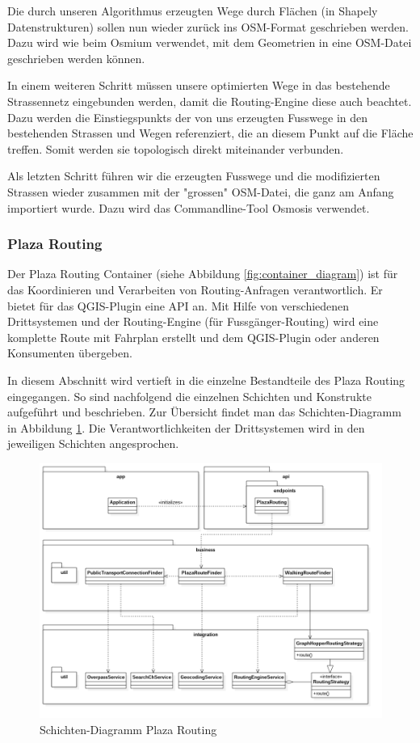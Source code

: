 Die durch unseren Algorithmus erzeugten Wege durch Flächen (in Shapely Datenstrukturen) sollen nun wieder zurück ins \ac{OSM}-Format geschrieben werden. Dazu wird wie beim  Osmium verwendet, mit dem Geometrien in eine OSM-Datei geschrieben werden können.

In einem weiteren Schritt müssen unsere optimierten Wege in das bestehende Strassennetz eingebunden werden, damit die Routing-Engine diese auch beachtet. Dazu werden die \glspl{Einstiegspunkt} der von uns erzeugten Fusswege in den bestehenden Strassen und Wegen referenziert, die an diesem Punkt auf die Fläche treffen. Somit werden sie topologisch direkt miteinander verbunden.

Als letzten Schritt führen wir die erzeugten Fusswege und die modifizierten Strassen wieder zusammen mit der "grossen" \ac{OSM}-Datei, die ganz am Anfang importiert wurde. Dazu wird das Commandline-Tool Osmosis \cite{osmosis} verwendet.

\subsubsection{Plaza Routing}
\label{architektur:Plaza Routing}
Der Plaza Routing Container (siehe Abbildung \ref{fig:container_diagram}) ist für das Koordinieren und Verarbeiten von Routing-Anfragen verantwortlich. Er bietet für das QGIS-Plugin eine API an. Mit Hilfe von verschiedenen Drittsystemen und der Routing-Engine (für Fussgänger-Routing) wird eine komplette Route mit Fahrplan erstellt und dem QGIS-Plugin oder anderen Konsumenten übergeben.

In diesem Abschnitt wird vertieft in die einzelne Bestandteile des Plaza Routing eingegangen. So sind nachfolgend die einzelnen Schichten und Konstrukte aufgeführt und beschrieben. Zur Übersicht findet man das Schichten-Diagramm in Abbildung \ref{fig:package_diagram_plaza_routing}. Die Verantwortlichkeiten der Drittsystemen wird in den jeweiligen Schichten angesprochen.

\begin{figure}[ht]
\centering
\includegraphics[width=1\linewidth]{projectdoc/img/package_diagram}
\caption[Schichten-Diagramm Plaza Routing]{Schichten-Diagramm Plaza Routing}
\label{fig:package_diagram_plaza_routing}
\end{figure}

